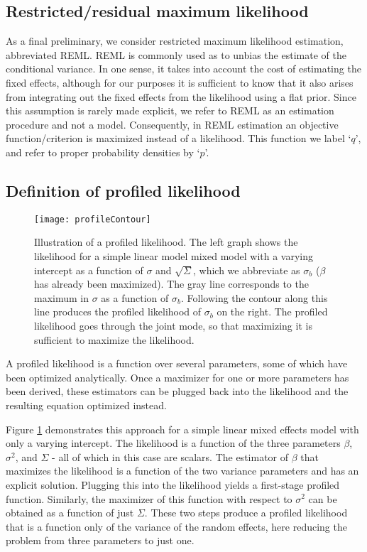 \documentclass[article,shortnames]{jss}
\begin{document}
\subsection{Restricted/residual maximum likelihood}

As a final preliminary, we consider restricted maximum likelihood estimation, abbreviated
REML. REML is commonly used as to unbias the estimate of the conditional
variance. In one sense, it takes into account the cost of estimating
the fixed effects, although for our purposes it is sufficient to know
that it also arises from integrating out the fixed effects from the
likelihood using a flat prior. Since this assumption is rarely made
explicit, we refer to REML as an estimation procedure and not a
model. Consequently, in REML estimation an objective
function/criterion is maximized instead of a likelihood. This function
we label `$q$', and refer to proper probability densities by
`$p$'.

\subsection{Definition of profiled likelihood}

\begin{figure}[t]
  \centering \texttt{[image: profileContour]}
  \caption[Profiled likelihood illustration]{Illustration of a profiled likelihood. The left graph shows
  the likelihood for a simple linear model mixed model with a varying intercept as a function of $\sigma$ and
  $\sqrt\Sigma$, which we abbreviate as $\sigma_b$ ($\beta$ has already been maximized). The gray line corresponds
  to the maximum in $\sigma$ as a function of $\sigma_b$. Following the contour along this line produces the profiled
  likelihood of $\sigma_b$ on the right. The profiled
  likelihood goes through the joint mode, so that maximizing it is
  sufficient to maximize the likelihood.}
  \label{fig:profileContour}
\end{figure}

A profiled likelihood is a function over several parameters, some of which
have been optimized analytically. Once a maximizer for one or more
parameters has been derived, these estimators can be plugged back into the
likelihood and the resulting equation optimized instead.

Figure \ref{fig:profileContour} demonstrates this approach for a simple
linear mixed effects model with only a varying intercept. The likelihood is a function of the three
parameters $\beta$, $\sigma^2$, and $\Sigma$ - all of which in this case are
scalars. The estimator of $\beta$ that maximizes the likelihood is a
function of the two variance parameters and has an explicit solution. Plugging
this into the likelihood yields a first-stage profiled
function. Similarly, the maximizer of this function with respect to
$\sigma^2$ can be obtained as a function of just $\Sigma$. These two steps
produce a profiled likelihood that is a function only of the variance of
the random effects, here reducing the problem from three parameters to just one.
\end{document}
